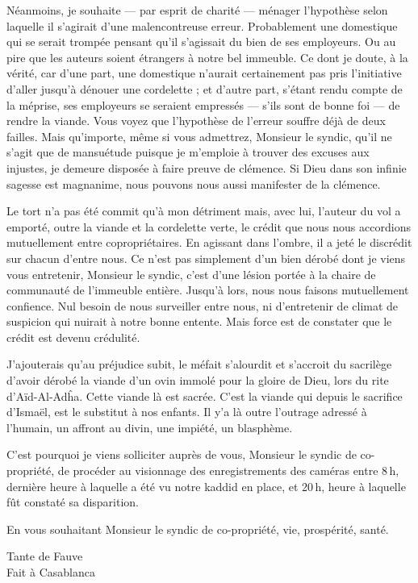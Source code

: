 Néanmoins, je souhaite — par esprit de charité — ménager l’hypothèse selon laquelle il s’agirait d’une malencontreuse erreur. Probablement une domestique qui se serait trompée pensant qu’il
s’agissait du bien de ses employeurs. Ou au pire que les auteurs soient étrangers à notre bel immeuble.
Ce dont je doute, à la vérité, car d’une part, une domestique n’aurait certainement pas pris l’initiative d’aller jusqu’à dénouer une cordelette ; et d’autre part, s’étant rendu compte de la
méprise, ses employeurs se seraient empressés — s’ils sont de bonne foi — de rendre la viande. Vous voyez que l’hypothèse de l’erreur souffre déjà de deux failles. Mais qu’importe, même si
vous admettrez, Monsieur le syndic, qu’il ne s’agit que de mansuétude puisque je m’emploie à trouver des excuses aux injustes, je demeure disposée à faire preuve de clémence. Si Dieu dans son
infinie sagesse est magnanime, nous pouvons nous aussi manifester de la clémence.


Le tort n’a pas été commit qu’à mon détriment mais, avec lui, l’auteur du vol a emporté, outre la viande et la cordelette verte, le crédit que nous nous accordions mutuellement entre
copropriétaires. En agissant dans l’ombre, il a jeté le discrédit sur chacun d’entre nous.
Ce n’est pas simplement d’un bien dérobé dont je viens vous entretenir, Monsieur le syndic, c’est d’une lésion portée à la chaire de  communauté de l’immeuble entière.
Jusqu’à lors, nous nous faisons mutuellement confience. Nul besoin de nous surveiller entre nous, ni d’entretenir de climat de suspicion qui nuirait à notre bonne entente. Mais force est de
constater que le crédit est devenu crédulité.

J’ajouterais qu’au préjudice subit, le méfait s’alourdit et s’accroit du sacrilège d’avoir dérobé la viande d’un ovin immolé pour la gloire de Dieu, lors du rite d’Aïd-Al-Adĥa. Cette viande
là est sacrée. C’est la viande qui depuis le sacrifice d’Ismaël, est le substitut à nos enfants. Il y’a là outre l’outrage adressé à l’humain, un affront au divin, une
impiété, un blasphème.


C’est pourquoi je viens solliciter auprès de vous, Monsieur le syndic de co-propriété, de procéder au visionnage des enregistrements des caméras entre 8\,h, dernière heure à laquelle a été vu
notre kaddid en place, et 20\,h, heure à laquelle fût constaté sa disparition.

En vous souhaitant Monsieur le syndic de co-propriété, vie, prospérité, santé.
\nopagebreak\\\vspace{1cm}\nopagebreak
\hfill\nopagebreak
\begin{minipage}{4cm}
  \begin{center}
    \vspace{1cm}
    Tante de Fauve\\
    Fait à Casablanca
  \end{center}
\end{minipage}


